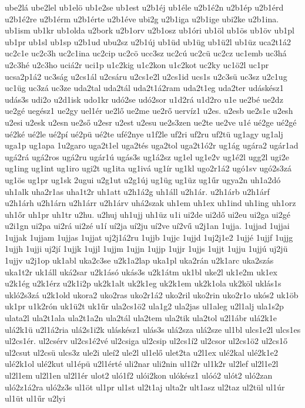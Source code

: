 {ube2lá
ube2lel
ub1elö
ub1e2se
ub1est
u2b1éj
ub1éle
u2b1é2n
u2b1ép
u2b1érd
u2b1é2re
u2b1érm
u2b1érte
u2b1éve
ubi2g
u2b1iga
u2b1ige
ubi2ke
u2b1ina.
ub1ism
ub1kr
ub1olda
u2bork
u2b1orv
u2b1osz
ub1óri
ub1öl
ub1ös
ub1öv
ub1pl
ub1pr
ub1sl
ub1sp
u2b1ud
ubu2sz
u2b1új
ub1üd
ub1üg
ub1ü2l
ub1üz
uca2t1á2
uc2c1e
uc2c3h
uc2c1ina
uc2cip
uc2cö
ucc3sz
uc2cú
uc2cü
uc2cz
uc1emb
uc3há
u2c3hé
u2c3ho
uciá2r
uci1p
u1c2kig
u1c2kon
u1c2kot
uc2ky
uc1ö2l
uc1pr
ucsa2p1á2
uc3ság
u2cs1ál
u2csáru
u2cs1e2l
u2cs1id
ucs1s
u2c3sü
uc3sz
u2c1ug
uc1üg
uc3zá
uc3ze
uda2tal
uda2tál
uda2t1á2ram
uda2t1eg
uda2ter
udáskész1
udás3s
udi2o
u2d1isk
udo1kr
udó2se
udó2sor
u1d2rá
u1d2ro
u1e
ue2bé
ue2dz
ue2gé
uegész1
ue2gy
uel1ér
ue2lő
ue2me
ue2rő
uervíz1
u2es.
u2esb
ue2s1e
u2esh
u2esi
u2esk
u2esn
ue2ső
u2esr
u2est
u2esu
ue2s3zen
ue2te
ue2ve
u1é
ué2ge
ué2gé
ué2ké
ué2le
ué2pí
ué2pü
ué2te
ufé2nye
u1f2le
uf2ri
uf2ru
uf2tü
ug1agy
ug1alj
uga1p
ug1apa
1u2garo
uga2t1el
uga2tés
uga2tol
uga2t1ó2r
ug1ág
ugára2
ugár1ad
ugá2rá
ugá2ros
ugá2ru
ugár1ú
ugás3s
ug1á2sz
ug1el
ug1e2v
ug1é2l
ugg2l
ugi2e
ug1ing
ug1int
ug1iro
ugi2t
ug1ita
ug1ivá
ug1ír
ug1kl
ugo2r1á2
ugó1sv
ugó2s3zá
ug1ös
ug1pr
ug1sk
2ugui
u2g1ut
u2g1új
ug1üg
ug1üz
ug1űr
ugya2n
uh1a2dó
uh1alk
uha2r1as
uha1t2r
uh1att
u2h1á2g
uh1áll
u2h1ár.
u2h1árb
u2h1árf
u2h1árh
u2h1árn
u2h1árr
u2h1árv
uhá2szak
uh1em
uh1ex
uh1ind
uh1ing
uh1orz
uh1őr
uh1pr
uh1tr
u2hu.
u2huj
uh1ujj
uh1üz
u1i
ui2de
ui2dő
ui2eu
ui2ga
ui2gé
u2i1gn
ui2pa
ui2rá
ui2zé
u1í
uí2ja
uí2ju
uí2ve
uí2vű
u2j1an
1ujja.
1ujjad
1ujjai
1ujjak
1ujjam
1ujjas
1ujjat
uj2j1á2ru
1ujjb
1ujjc
1ujjd
1uj2j1e2
1ujjé
1ujjf
1ujjg
1ujjh
1ujji
uj2jí
1ujjk
1ujjl
1ujjm
1ujjn
1ujjp
1ujjr
1ujjs
1ujjt
1ujju
1ujjú
uj2jü
1ujjv
u2j1op
uk1abl
uka2c3se
u2k1a2lap
uka1pl
uka2rán
u2k1arc
uka2szás
uka1t2r
uk1áll
uká2sar
u2k1ásó
ukás3s
u2k1átm
uk1bl
uke2l
uk1e2m
uk1ex
u2k1ég
u2k1érz
u2k1i2p
uk2k1alt
uk2k1eg
uk2k1em
uk2k1ola
uk2köl
uklás1s
ukló2s3zá
u2k1old
ukora2
uko2ras
uko2r1á2
uko2ril
uko2rin
uko2r1o
ukós2
uk1öb
uk1pr
u1k2rón
uk1ü2t
uk1űr
ula2cs1ö2
ula1g2
ula2jas
ul1aleg
u2l1alj
ula1s2p
ulata2l
ula2t1ala
ula2t1a2n
ula2tál
ula2tem
ula2tik
ula2tol
u2l1ábr
ulá2k1e
ulá2k1ü
u2l1á2ria
ulá2s1i2k
uláskész1
ulás3s
ulá2sza
ulá2sze
ul1bl
ulcs1e2l
ulcs1es
ul2cs1ér.
ul2csérv
ul2cs1é2vé
ul2csiga
ul2csip
ul2cs1í2
ul2csor
ul2cs1ö2
ul2cs1ő
ul2csut
ul2csü
ulcs3z
ule2i
uleí2
ule2l
ul1elő
ulet2ta
u2l1ex
ulé2kal
ulé2k1e2
ulé2k1ol
ulé2kut
ul1épü
u2l1érté
uli2nar
uli2nin
ul1í2r
ul1k2r
ul2lef
ul2l1e2l
ul2l1em
ul2l1en
ul2l1ér
ulot2
uló1f2
ulói2kon
ulókész1
ulóó2
ulót2
uló2zan
uló2z1á2ra
uló2z3s
ul1öt
ul1pr
ul1st
ul2t1aj
ulta2r
ult1asz
ul2taz
ul2tül
ul1úr
ul1üt
ul1űr
u2lyi
}
